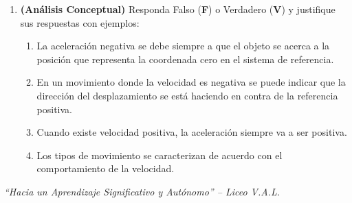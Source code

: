 \documentclass[11pt, letterpaper]{article}
\newif\ifmostrarrespuestas
\newcommand{\respuesta}[1]{
	\ifmostrarrespuestas
	\par\vspace{0.2cm}
	\begin{tcolorbox}[colback=blue!5!white, colframe=valblue, boxrule=0.5pt, arc=1mm, left=2mm, right=2mm, top=1.5mm, bottom=1.5mm]
		\footnotesize \textbf{\textcolor{valblue}{Solución:}} \textcolor{blue!80!black}{#1}
	\end{tcolorbox}
	\vspace{0.2cm}
	\fi
}
\begin{document}
\begin{enumerate}[leftmargin=*, itemsep=0.6cm]
		\item \textbf{(Análisis Conceptual)} Responda Falso (\textbf{F}) o Verdadero (\textbf{V}) y justifique sus respuestas con ejemplos:
		\begin{enumerate}[label=\alph*., itemsep=0.25cm]
			\item La aceleración negativa se debe siempre a que el objeto se acerca a la posición que representa la coordenada cero en el sistema de referencia. \underline{\hspace{1cm}}
			\item En un movimiento donde la velocidad es negativa se puede indicar que la dirección del desplazamiento se está haciendo en contra de la referencia positiva. \underline{\hspace{1cm}}
			\item Cuando existe velocidad positiva, la aceleración siempre va a ser positiva. \underline{\hspace{1cm}}
			\item Los tipos de movimiento se caracterizan de acuerdo con el comportamiento de la velocidad. \underline{\hspace{1cm}}
		\end{enumerate}
		\respuesta{
			\textbf{a) F:} Una aceleración negativa mientras se avanza hacia adelante indica disminución de la velocidad (frenado), aunque el móvil se esté alejando del origen $x=0$.\\
			\textbf{b) V:} Al ser $v = \frac{x_f - x_0}{t_f - t_0}$, un signo negativo implica que $x_f < x_0$, desplazándose en sentido opuesto a la referencia.\\
			\textbf{c) F:} Si un auto avanza en sentido positivo ($v > 0$) pero frena ante un semáforo, su aceleración es negativa ($a < 0$).\\
			\textbf{d) V:} Si la velocidad es constante se tiene un MU ($a=0$), y si la velocidad varía uniformemente en el tiempo se tiene un MUA ($a = \text{constante} \neq 0$).
		}
		
	\end{enumerate}
	
	\vfill
	\begin{center}
		\footnotesize \textit{\color{valdark!70} ``Hacia un Aprendizaje Significativo y Autónomo'' -- Liceo V.A.L.}
	\end{center}
	
\end{document}
